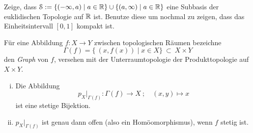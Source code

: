 \begin{aufgabe}
	Zeige, dass $\mathcal S:=\{(-\infty,a)\mid a\in\mathbb{R}\}\cup\{(a,\infty)\mid a\in\mathbb{R}\}$ eine Subbasis der euklidischen Topologie auf $\mathbb{R}$ ist. Benutze diese um nochmal zu zeigen, dass das Einheitsintervall $[0,1]$ kompakt ist.
\end{aufgabe}
\begin{aufgabe}
	Für eine Abbildung $f\colon X \rightarrow Y$ zwischen topologischen
	Räumen bezeichne
	\[\Gamma(f) = \{ \ (x,f(x)) \mid x \in X\} \ \subset\ X \times Y\]
	den {\it Graph} von $f$, versehen mit der Unterraumtopologie der
	Produkttopologie auf $X \times Y$.
	\begin{enumerate}[i)]
		\item Die Abbildung \[p_X|_{\Gamma(f)}\colon\Gamma(f) \rightarrow X\ ;\quad (x,y) \mapsto x \]
		ist eine stetige Bijektion.
		\item $p_X|_{\Gamma(f)}$ ist genau dann offen (also ein Homöomorphismus), wenn $f$ stetig ist.
	\end{enumerate}
\end{aufgabe}

